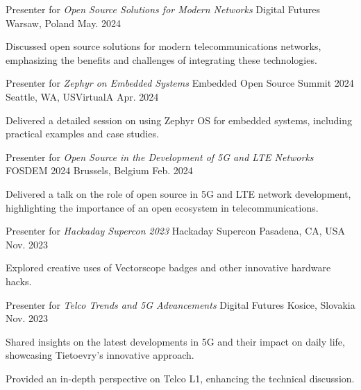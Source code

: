 \begin{cventries}

	\cventry
	{Presenter for \textit{Open Source Solutions for Modern Networks}}
	{Digital Futures}
	{Warsaw, Poland}
	{May. 2024}
	{
		\begin{cvitems}
		\item {Discussed open source solutions for modern telecommunications networks, emphasizing the benefits and challenges of integrating these technologies.}
		\end{cvitems}
	}

	\cventry
	{Presenter for \textit{Zephyr on Embedded Systems}}
	{Embedded Open Source Summit 2024}
	{Seattle, WA, USVirtualA}
	{Apr. 2024}
	{
		\begin{cvitems}
			\item {Delivered a detailed session on using Zephyr OS for embedded systems, including practical examples and case studies.}
		\end{cvitems}
	}

	\cventry
	{Presenter for \textit{Open Source in the Development of 5G and LTE Networks}}
	{FOSDEM 2024}
	{Brussels, Belgium}
	{Feb. 2024}
	{
		\begin{cvitems}
		\item {Delivered a talk on the role of open source in 5G and LTE network development, highlighting the importance of an open ecosystem in telecommunications.}
		\end{cvitems}
	}

	\cventry
	{Presenter for \textit{Hackaday Supercon 2023}}
	{Hackaday Supercon}
	{Pasadena, CA, USA}
	{Nov. 2023}
	{
		\begin{cvitems}
		\item {Explored creative uses of Vectorscope badges and other innovative hardware hacks.}
		\end{cvitems}
	}

	\cventry
	{Presenter for \textit{Telco Trends and 5G Advancements}}
	{Digital Futures}
	{Kosice, Slovakia}
	{Nov. 2023}
	{
		\begin{cvitems}
		\item {Shared insights on the latest developments in 5G and their impact on daily life, showcasing Tietoevry's innovative approach.}
		\item {Provided an in-depth perspective on Telco L1, enhancing the technical discussion.}
		\end{cvitems}
	}


\end{cventries}
